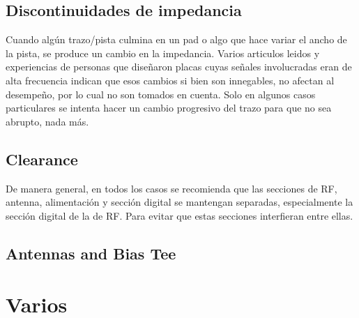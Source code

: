 \documentclass[a4paper,12pt]{report} %
\begin{document}
\section{Discontinuidades de impedancia}

Cuando algún trazo/pista culmina en un pad o algo que hace variar el ancho de la pista, se produce un cambio en la impedancia. Varios articulos leidos y experiencias de personas que diseñaron placas cuyas señales involucradas eran de alta frecuencia indican que esos cambios si bien son innegables, no afectan al desempeño, por lo cual no son tomados en cuenta. Solo en algunos casos particulares se intenta hacer un cambio progresivo del trazo para que no sea abrupto, nada más. 

\section{Clearance}

De manera general, en todos los casos se recomienda que las secciones de RF, antenna, alimentación y sección digital se mantengan separadas, especialmente la sección digital de la de RF. Para evitar que estas secciones interfieran entre ellas.

\section{Antennas and Bias Tee}














\chapter*{Varios}
\end{document}
